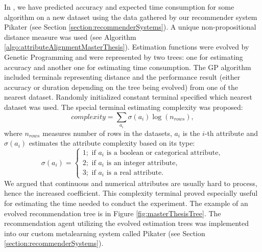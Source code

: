 In \cite{diplomka, jaIcannga2013}, we have predicted accuracy and expected time consumption  for some algorithm on a new dataset using the data gathered by our recommender system Pikater (see Section \ref{section:recommenderSystems}). A unique non-propositional distance measure was used (see Algorithm \ref{algo:attributeAlignmentMasterThesis}). 
Estimation functions were evolved by Genetic Programming and were represented by two trees: one for estimating accuracy and another one for estimating time consumption. The GP algorithm included terminals representing distance and the performance result (either accuracy or duration depending on the tree being evolved) from one of the nearest dataset. Randomly initialized constant terminal specified which nearest dataset was used. The special terminal estimating complexity was proposed: 
\begin{equation}
complexity = \sum_{a_i}\sigma(a_i)\log(n_{rows}),
\end{equation}
where $n_{rows}$ measures number of rows in the datasets, $a_i$ is the $i$-th attribute and $\sigma(a_i)$ estimates the attribute complexity based on its type:
	\begin{equation}
	\sigma(a_i)=
	\begin{cases}
	1; \text{ if  } a_i \text{ is a boolean or categorical attribute}, \\
	2; \text{ if  } a_i \text{ is an integer attribute}, \\
	3; \text{ if  } a_i \text{ is a real attribute}.
	\end{cases}
	\end{equation}
We argued that continuous and numerical attributes are usually hard to process, hence the increased coefficient. This complexity terminal proved especially useful for estimating the time needed to conduct the experiment.
The example of an evolved recommendation tree is in Figure \ref{fig:masterThesisTree}.
The recommendation agent utilizing the evolved estimation trees was implemented into our custom metalearning system called Pikater (see Section \ref{section:recommenderSystems}).

